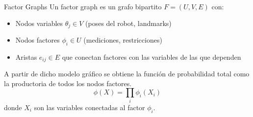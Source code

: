 \documentclass[10pt]{beamer}
\begin{document}
        \begin{frame}{Factor Graphs}
            Un factor graph es un grafo bipartito $F = (U, V, E)$ con:
                \begin{itemize}
                    \item Nodos variables $\theta_j \in V$ (poses del robot, landmarks)
                    \item Nodos factores $\phi_i \in U$ (mediciones, restricciones)
                    \item Aristas $e_{ij} \in E$ que conectan factores con las variables de las que dependen
                \end{itemize}
                \vspace{0.2 cm}

            A partir de dicho modelo gráfico se obtiene la función de probabilidad total como la productoria de todos los nodos factores.
                $$\phi(X) = \prod_i \phi_i(X_i)$$
            donde $X_i$ son las variables conectadas al factor $\phi_i$.
            
            
            \begin{center}
            \end{center}
        \end{frame}
\end{document}

